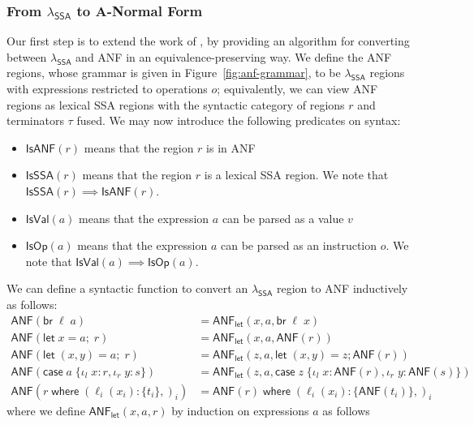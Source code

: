 \documentclass[acmsmall,screen,review]{acmart}
\newcommand{\ms}[1]{\ensuremath{\mathsf{#1}}}
\newcommand{\lto}{:}
\newcommand{\linl}[1]{\iota_l\;{#1}}
\newcommand{\linr}[1]{\iota_r\;{#1}}
\newcommand{\letexpr}[3]{\ensuremath{\ms{let}\;#1 = #2;\;#3}}
\newcommand{\letstmt}[3]{\ensuremath{\ms{let}\;#1 = #2; #3}}
\newcommand{\brb}[2]{\ms{br}\;#1\;#2}
\newcommand{\casestmt}[5]{\ms{case}\;#1\;\{\linl{#2} \lto #3, \linr{#4} \lto #5\}}
\newcommand{\where}[2]{#1\;\ms{where}\;#2}
\newcommand{\wbranch}[3]{#1(#2) \lto \{#3\}}
\newcommand{\toanf}[1]{\ms{ANF}(#1)}
\newcommand{\isanf}[1]{\ms{IsANF}(#1)}
\newcommand{\isvalex}[1]{\ms{IsVal}(#1)}
\newcommand{\isopex}[1]{\ms{IsOp}(#1)}
\newcommand{\isssa}[1]{\ms{IsSSA}(#1)}
\newcommand{\letanf}[3]{\ms{ANF}_{\ms{let}}(#1, #2, #3)}
\newcommand{\isotopessa}{\(\lambda_{\ms{SSA}}\)}
\begin{document}
\subsubsection{From \isotopessa{} to A-Normal Form}

Our first step is to extend the work of \citet{chakravarty-functional-ssa-2003}, by providing an
algorithm for converting between \isotopessa{} and ANF in an equivalence-preserving way. We define
the ANF regions, whose grammar is given in Figure~\ref{fig:anf-grammar}, to be \isotopessa{} regions
with expressions restricted to operations $o$; equivalently, we can view ANF regions as lexical SSA
regions with the syntactic category of regions $r$ and terminators $\tau$ fused. We may now
introduce the following predicates on syntax:
\begin{itemize}
  \item $\isanf{r}$ means that the region $r$ is in ANF
  \item $\isssa{r}$ means that the region $r$ is a lexical SSA region.  We note that $\isssa{r} \implies \isanf{r}$.
  \item $\isvalex{a}$ means that the expression $a$ can be parsed as a value $v$
  \item $\isopex{a}$ means that the expression $a$ can be parsed as an instruction $o$.
        We note that $\isvalex{a} \implies \isopex{a}$.
\end{itemize}
We can define a syntactic function to convert an \isotopessa{} region to ANF inductively as follows:
\begin{equation}
  \begin{aligned}
    \toanf{\brb{\ell}{a}} &= \letanf{x}{a}{\brb{\ell}{x}} \\
    \toanf{\letexpr{x}{a}{r}} &= \letanf{x}{a}{\toanf{r}} \\
    \toanf{\letexpr{(x, y)}{a}{r}} &= \letanf{z}{a}{\letstmt{(x, y)}{z}{\toanf{r}}} \\
    \toanf{\casestmt{a}{x}{r}{y}{s}} &= \letanf{z}{a}{\casestmt{z}{x}{\toanf{r}}{y}{\toanf{s}}} \\
    \toanf{\where{r}{(\wbranch{\ell_i}{x_i}{t_i},)_i}}
      &= \where{\toanf{r}}{(\wbranch{\ell_i}{x_i}{\toanf{t_i}},)_i}
  \end{aligned}
\end{equation}
where we define $\letanf{x}{a}{r}$ by induction on expressions $a$ as follows
\end{document}
